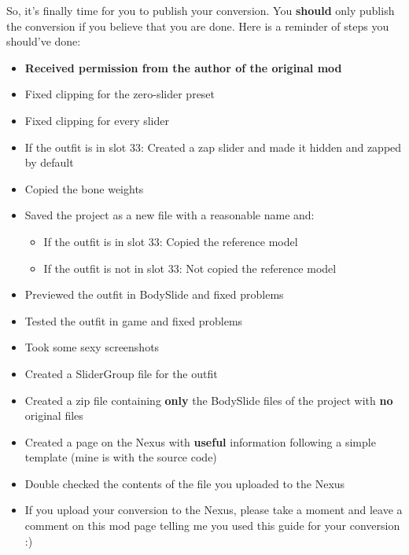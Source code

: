 So, it's finally time for you to publish your conversion. You \textbf{should} only publish the conversion if you believe 
that you are done. Here is a reminder of steps you should've done:
\begin{itemize}
    \item \textbf{Received permission from the author of the original mod}
    \item Fixed clipping for the zero-slider preset
    \item Fixed clipping for every slider
    \item If the outfit is in slot 33: Created a zap slider and made it hidden and zapped by default
    \item Copied the bone weights
    \item Saved the project as a new file with a reasonable name and:
    \begin{itemize}
        \item If the outfit is in slot 33: Copied the reference model
        \item If the outfit is not in slot 33: Not copied the reference model
    \end{itemize}
    \item Previewed the outfit in BodySlide and fixed problems
    \item Tested the outfit in game and fixed problems
    \item Took some sexy screenshots
    \item Created a SliderGroup file for the outfit
    \item Created a zip file containing \textbf{only} the BodySlide files of the project with \textbf{no} original files
    \item Created a page on the Nexus with \textbf{useful} information following a simple template (mine is with the source code)
    \item Double checked the contents of the file you uploaded to the Nexus
    \item If you upload your conversion to the Nexus, please take a moment and leave a comment on this mod page telling me you used this guide for your conversion :)
\end{itemize}